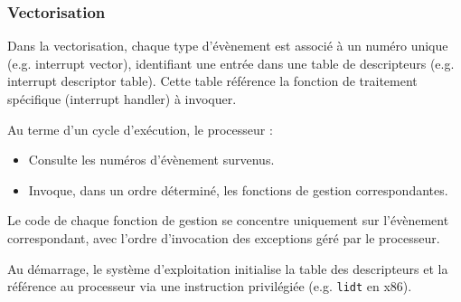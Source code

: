 \subsubsection{Vectorisation}

Dans la vectorisation, chaque type d’évènement est associé à un numéro unique (e.g. interrupt vector), identifiant une entrée dans une table de descripteurs (e.g. interrupt descriptor table). Cette table référence la fonction de traitement spécifique (interrupt handler) à invoquer.

Au terme d’un cycle d’exécution, le processeur :
\begin{itemize}
    \item Consulte les numéros d’évènement survenus.
    \item Invoque, dans un ordre déterminé, les fonctions de gestion correspondantes.
\end{itemize}

Le code de chaque fonction de gestion se concentre uniquement sur l’évènement correspondant, avec l’ordre d’invocation des exceptions géré par le processeur.

Au démarrage, le système d’exploitation initialise la table des descripteurs et la référence au processeur via une instruction privilégiée (e.g. \texttt{lidt} en x86).


